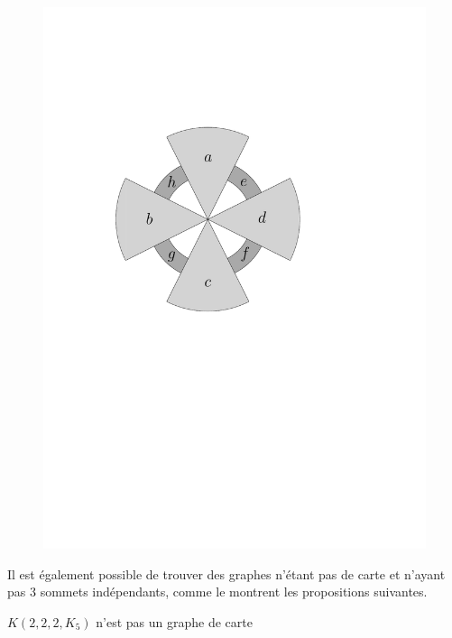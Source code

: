 \documentclass{scrartcl}
\begin{document}
\begin{flushleft}
\begin{figure}[h]
\begin{center}
        \hspace*{1.5cm}
        \includegraphics[page=\ipeFigpinch, scale = 0.6]{figs}
    \end{center}
\end{figure}

Il est également possible de trouver des graphes n'étant pas de carte et n'ayant pas $3$ sommets indépendants, comme le montrent les
propositions suivantes.

\begin{prop}\label{K222K5}
    $K(2,2,2,K_5)$ n'est pas un graphe de carte
\end{prop}


\end{flushleft}
\end{document}
